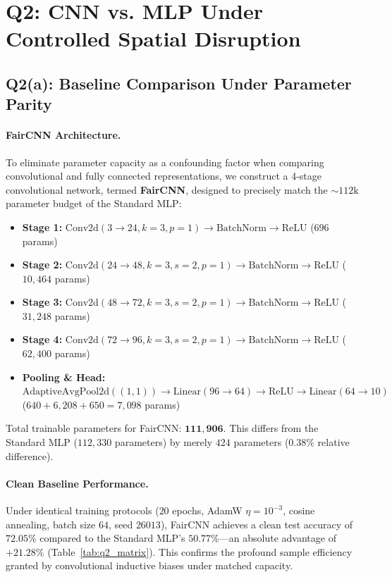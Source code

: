 \section{Q2: CNN vs. MLP Under Controlled Spatial Disruption}
\label{sec:q2}

\subsection{Q2(a): Baseline Comparison Under Parameter Parity}
\paragraph{FairCNN Architecture.}
To eliminate parameter capacity as a confounding factor when comparing convolutional and fully connected representations, we construct a 4-stage convolutional network, termed \textbf{FairCNN}, designed to precisely match the $\sim 112\text{k}$ parameter budget of the Standard MLP:
\begin{itemize}
    \item \textbf{Stage 1:} $\text{Conv2d}(3 \to 24, k=3, p=1) \to \text{BatchNorm} \to \text{ReLU}$ ($696$ params)
    \item \textbf{Stage 2:} $\text{Conv2d}(24 \to 48, k=3, s=2, p=1) \to \text{BatchNorm} \to \text{ReLU}$ ($10{,}464$ params)
    \item \textbf{Stage 3:} $\text{Conv2d}(48 \to 72, k=3, s=2, p=1) \to \text{BatchNorm} \to \text{ReLU}$ ($31{,}248$ params)
    \item \textbf{Stage 4:} $\text{Conv2d}(72 \to 96, k=3, s=2, p=1) \to \text{BatchNorm} \to \text{ReLU}$ ($62{,}400$ params)
    \item \textbf{Pooling \& Head:} $\text{AdaptiveAvgPool2d}((1, 1)) \to \text{Linear}(96 \to 64) \to \text{ReLU} \to \text{Linear}(64 \to 10)$ ($640 + 6{,}208 + 650 = 7{,}098$ params)
\end{itemize}
Total trainable parameters for FairCNN: $\mathbf{111{,}906}$. This differs from the Standard MLP ($112{,}330$ parameters) by merely $424$ parameters ($\mathbf{0.38\%}$ relative difference).

\paragraph{Clean Baseline Performance.}
Under identical training protocols ($20$ epochs, AdamW $\eta=10^{-3}$, cosine annealing, batch size $64$, seed $26013$), FairCNN achieves a clean test accuracy of $\mathbf{72.05\%}$ compared to the Standard MLP's $\mathbf{50.77\%}$—an absolute advantage of $\mathbf{+21.28\%}$ (Table~\ref{tab:q2_matrix}). This confirms the profound sample efficiency granted by convolutional inductive biases under matched capacity.

